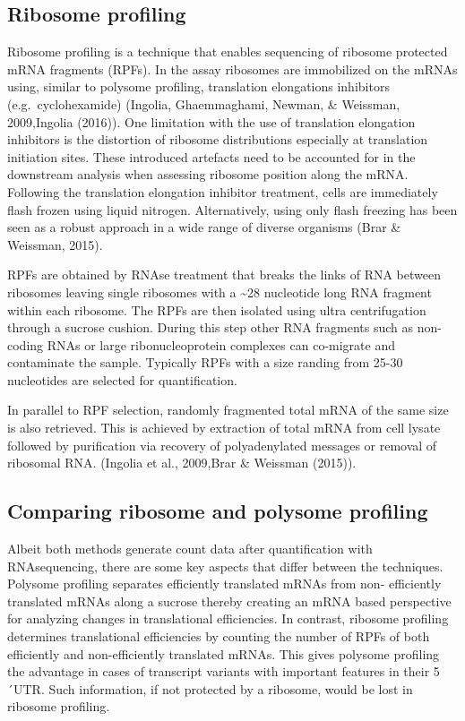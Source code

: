 \documentclass[12pt,openany]{book}
\begin{document}
\subsection{Ribosome profiling} \label{riboseq}

Ribosome profiling is a technique that enables sequencing of ribosome
protected mRNA fragments (RPFs). In the assay ribosomes are immobilized
on the mRNAs using, similar to polysome profiling, translation
elongations inhibitors (e.g.~cyclohexamide) (Ingolia, Ghaemmaghami,
Newman, \& Weissman, 2009,Ingolia (2016)). One limitation with the use
of translation elongation inhibitors is the distortion of ribosome
distributions especially at translation initiation sites. These
introduced artefacts need to be accounted for in the downstream analysis
when assessing ribosome position along the mRNA. Following the
translation elongation inhibitor treatment, cells are immediately flash
frozen using liquid nitrogen. Alternatively, using only flash freezing
has been seen as a robust approach in a wide range of diverse organisms
(Brar \& Weissman, 2015).

RPFs are obtained by RNAse treatment that breaks the links of RNA
between ribosomes leaving single ribosomes with a \textasciitilde{}28
nucleotide long RNA fragment within each ribosome. The RPFs are then
isolated using ultra centrifugation through a sucrose cushion. During
this step other RNA fragments such as non-coding RNAs or large
ribonucleoprotein complexes can co-migrate and contaminate the sample.
Typically RPFs with a size randing from 25-30 nucleotides are selected
for quantification.

In parallel to RPF selection, randomly fragmented total mRNA of the same
size is also retrieved. This is achieved by extraction of total mRNA
from cell lysate followed by purification via recovery of polyadenylated
messages or removal of ribosomal RNA. (Ingolia et al., 2009,Brar \&
Weissman (2015)).

\subsection{Comparing ribosome and polysome profiling}

Albeit both methods generate count data after quantification with
RNAsequencing, there are some key aspects that differ between the
techniques. Polysome profiling separates efficiently translated mRNAs
from non- efficiently translated mRNAs along a sucrose thereby creating
an mRNA based perspective for analyzing changes in translational
efficiencies. In contrast, ribosome profiling determines translational
efficiencies by counting the number of RPFs of both efficiently and
non-efficiently translated mRNAs. This gives polysome profiling the
advantage in cases of transcript variants with important features in
their 5´UTR. Such information, if not protected by a ribosome, would be
lost in ribosome profiling.
\end{document}
